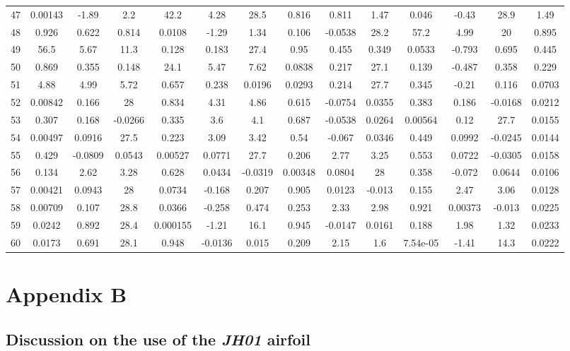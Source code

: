 \begin{longtable}{lccccccccccccc}
47 & 0.00143 & -1.89 & 2.2 & 42.2 & 4.28 & 28.5 & 0.816 & 0.811 & 1.47 & 0.046 & -0.43 & 28.9 & 1.49\\
48 & 0.926 & 0.622 & 0.814 & 0.0108 & -1.29 & 1.34 & 0.106 & -0.0538 & 28.2 & 57.2 & 4.99 & 20 & 0.895\\
49 & 56.5 & 5.67 & 11.3 & 0.128 & 0.183 & 27.4 & 0.95 & 0.455 & 0.349 & 0.0533 & -0.793 & 0.695 & 0.445\\
50 & 0.869 & 0.355 & 0.148 & 24.1 & 5.47 & 7.62 & 0.0838 & 0.217 & 27.1 & 0.139 & -0.487 & 0.358 & 0.229\\
51 & 4.88 & 4.99 & 5.72 & 0.657 & 0.238 & 0.0196 & 0.0293 & 0.214 & 27.7 & 0.345 & -0.21 & 0.116 & 0.0703\\
52 & 0.00842 & 0.166 & 28 & 0.834 & 4.31 & 4.86 & 0.615 & -0.0754 & 0.0355 & 0.383 & 0.186 & -0.0168 & 0.0212\\
53 & 0.307 & 0.168 & -0.0266 & 0.335 & 3.6 & 4.1 & 0.687 & -0.0538 & 0.0264 & 0.00564 & 0.12 & 27.7 & 0.0155\\
54 & 0.00497 & 0.0916 & 27.5 & 0.223 & 3.09 & 3.42 & 0.54 & -0.067 & 0.0346 & 0.449 & 0.0992 & -0.0245 & 0.0144\\
55 & 0.429 & -0.0809 & 0.0543 & 0.00527 & 0.0771 & 27.7 & 0.206 & 2.77 & 3.25 & 0.553 & 0.0722 & -0.0305 & 0.0158\\
56 & 0.134 & 2.62 & 3.28 & 0.628 & 0.0434 & -0.0319 & 0.00348 & 0.0804 & 28 & 0.358 & -0.072 & 0.0644 & 0.0106\\
57 & 0.00421 & 0.0943 & 28 & 0.0734 & -0.168 & 0.207 & 0.905 & 0.0123 & -0.013 & 0.155 & 2.47 & 3.06 & 0.0128\\
58 & 0.00709 & 0.107 & 28.8 & 0.0366 & -0.258 & 0.474 & 0.253 & 2.33 & 2.98 & 0.921 & 0.00373 & -0.013 & 0.0225\\
59 & 0.0242 & 0.892 & 28.4 & 0.000155 & -1.21 & 16.1 & 0.945 & -0.0147 & 0.0161 & 0.188 & 1.98 & 1.32 & 0.0233\\
60 & 0.0173 & 0.691 & 28.1 & 0.948 & -0.0136 & 0.015 & 0.209 & 2.15 & 1.6 & 7.54e-05 & -1.41 & 14.3 & 0.0222 \\
\bottomrule
\end{longtable}
\normalsize

\section*{Appendix B}

\subsection{Discussion on the use of the \emph{JH01} airfoil}

